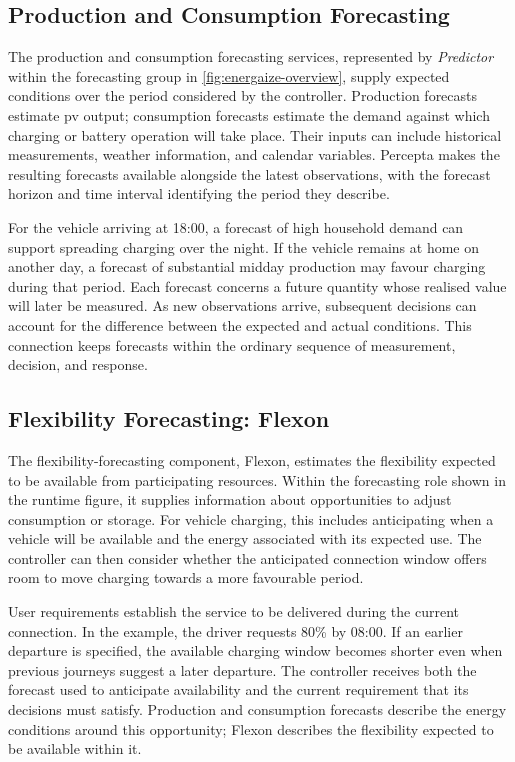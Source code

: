 \subsection{Production and Consumption Forecasting}
\label{sec:energaize-prediction}

The production and consumption forecasting services, represented by \emph{Predictor} within the forecasting group in \cref{fig:energaize-overview}, supply expected conditions over the period considered by the controller. Production forecasts estimate \gls{pv} output; consumption forecasts estimate the demand against which charging or battery operation will take place. Their inputs can include historical measurements, weather information, and calendar variables. Percepta makes the resulting forecasts available alongside the latest observations, with the forecast horizon and time interval identifying the period they describe.

For the vehicle arriving at 18:00, a forecast of high household demand can support spreading charging over the night. If the vehicle remains at home on another day, a forecast of substantial midday production may favour charging during that period. Each forecast concerns a future quantity whose realised value will later be measured. As new observations arrive, subsequent decisions can account for the difference between the expected and actual conditions. This connection keeps forecasts within the ordinary sequence of measurement, decision, and response.

\subsection{Flexibility Forecasting: Flexon}
\label{sec:energaize-flexon}

The flexibility-forecasting component, Flexon, estimates the flexibility expected to be available from participating resources. Within the forecasting role shown in the runtime figure, it supplies information about opportunities to adjust consumption or storage. For vehicle charging, this includes anticipating when a vehicle will be available and the energy associated with its expected use. The controller can then consider whether the anticipated connection window offers room to move charging towards a more favourable period.

User requirements establish the service to be delivered during the current connection. In the example, the driver requests 80\% by 08:00. If an earlier departure is specified, the available charging window becomes shorter even when previous journeys suggest a later departure. The controller receives both the forecast used to anticipate availability and the current requirement that its decisions must satisfy. Production and consumption forecasts describe the energy conditions around this opportunity; Flexon describes the flexibility expected to be available within it.

